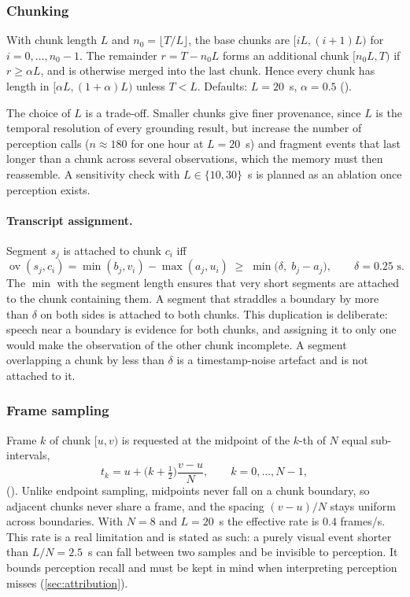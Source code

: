 \subsubsection{Chunking}\label{sec:chunking}
With chunk length $L$ and $n_0=\lfloor T/L\rfloor$, the base chunks are
$[iL,(i+1)L)$ for $i=0,\dots,n_0-1$. The remainder $r=T-n_0L$ forms an
additional chunk $[n_0L,T)$ if $r\ge\alpha L$, and is otherwise merged into
the last chunk. Hence every chunk has length in $[\alpha L,(1+\alpha)L)$
unless $T<L$. Defaults: $L=20$~s, $\alpha=0.5$ ().

The choice of $L$ is a trade-off. Smaller chunks give finer provenance, since
$L$ is the temporal resolution of every grounding result, but increase the
number of perception calls ($n\approx 180$ for one hour at $L=20$~s) and
fragment events that last longer than a chunk across several observations,
which the memory must then reassemble. A sensitivity check with
$L\in\{10,30\}$~s is planned as an ablation once perception exists.

\paragraph{Transcript assignment.}
Segment $s_j$ is attached to chunk $c_i$ iff
\begin{equation}
  \operatorname{ov}(s_j,c_i) = \min(b_j,v_i)-\max(a_j,u_i) \;\ge\;
  \min\bigl(\delta,\; b_j-a_j\bigr),
  \qquad \delta=0.25\text{ s}.
\end{equation}
The $\min$ with the segment length ensures that very short segments are
attached to the chunk containing them. A segment that straddles a boundary by
more than $\delta$ on both sides is attached to both chunks. This duplication
is deliberate: speech near a boundary is evidence for both chunks, and
assigning it to only one would make the observation of the other chunk
incomplete. A segment overlapping a chunk by less than $\delta$ is a
timestamp-noise artefact and is not attached to it.

\subsubsection{Frame sampling}
Frame $k$ of chunk $[u,v)$ is requested at the midpoint of the $k$-th of $N$
equal sub-intervals,
\begin{equation}
  t_k = u + \bigl(k+\tfrac12\bigr)\frac{v-u}{N}, \qquad k=0,\dots,N-1,
\end{equation}
(). Unlike endpoint sampling, midpoints never fall on
a chunk boundary, so adjacent chunks never share a frame, and the spacing
$(v-u)/N$ stays uniform across boundaries. With $N=8$ and $L=20$~s the
effective rate is $0.4$ frames/s. This rate is a real limitation and is stated
as such: a purely visual event shorter than $L/N=2.5$~s can fall between two
samples and be invisible to perception. It bounds perception recall and must
be kept in mind when interpreting perception misses
(\cref{sec:attribution}).

